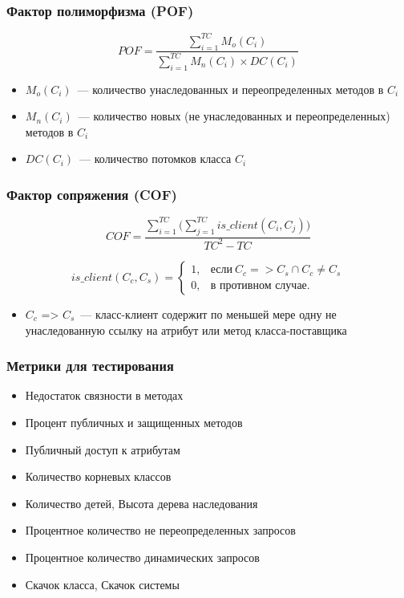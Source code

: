 \documentclass{../../slides-style}
\begin{document}
    \begin{frame}
        \frametitle{Фактор полиморфизма (POF)}
        $$POF = \frac{\sum\limits_{i=1}^{TC}M_o(C_i)}{\sum\limits_{i=1}^{TC}M_n(C_i) \times DC(C_i)}$$
        \begin{itemize}
            \item $M_o(C_i)$~--- количество унаследованных и переопределенных методов в $C_i$
            \item $M_n(C_i)$~--- количество новых (не унаследованных и переопределенных) методов в $C_i$
            \item $DC(C_i)$~--- количество потомков класса $C_i$
        \end{itemize}
    \end{frame}

    \begin{frame}
        \frametitle{Фактор сопряжения (COF)}
        $$COF = \frac{\sum\limits_{i=1}^{TC}\biggl(\sum\limits_{j=1}^{TC}is\_client(C_i, C_j)\biggl)}{TC^2 - TC}$$

        \begin{equation*}
            is\_client(C_c, C_s) = \begin{cases}
                1, & \text{если}\ C_c => C_s \cap C_c \neq C_s \\
                0, & \text{в противном случае}.
            \end{cases}
        \end{equation*}

        \begin{itemize}
            \item $C_c$ => $C_s$~--- класс-клиент содержит по меньшей мере одну не унаследованную ссылку на атрибут или метод класса-поставщика
        \end{itemize}
    \end{frame}

    \begin{frame}
        \frametitle{Метрики для тестирования}
        \begin{itemize}
            \item Недостаток связности в методах
            \item Процент публичных и защищенных методов
            \item Публичный доступ к атрибутам
            \item Количество корневых классов
            \item Количество детей, Высота дерева наследования
            \item Процентное количество не переопределенных запросов
            \item Процентное количество динамических запросов
            \item Скачок класса, Скачок системы
        \end{itemize}
    \end{frame}
\end{document}
